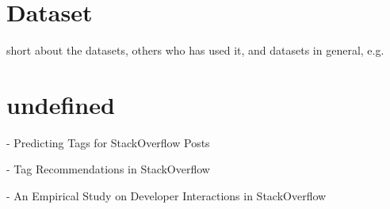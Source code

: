 \begin{comment}
\end{itemize}
Experimental results show that \gls{svm}s consistently achieve good performance on text categorization tasks, outperforming existing methods substantially and significantly. 
With their ability to generalize well in high dimensional feature spaces, \gls{svm}s eliminate the need for feature selection, making the application of text categorization considerably easier.
Another advantage of \gls{svm}s over the conventional methods is their robustness. 
\gls{svm}s show good performance in all experiments, avoiding catastrophic failure, as observed with the conventional methods on some tasks. 
Furthermore, \gls{svm}s do not require any parameter tuning, since they can find good parameter settings automatically. 
All this makes \gls{svm}s a very promising and easy-to-use method for learning text classifiers from examples.
\cite{Joachims1998}
\end{comment}


\section{Dataset}
\label{sec:dataset}
short about the datasets, others who has used it, and datasets in general, e.g. 
\cite{Klein2016,SpaceMachine.net2016,Wissner-Gross2016}









\section{undefined}
\label{sec:undefined}

\textcite{Stanley2013} - Predicting Tags for StackOverflow Posts

\textcite{Short2014} - Tag Recommendations in StackOverflow

\textcite{Wang2013} - An Empirical Study on Developer Interactions in StackOverflow

